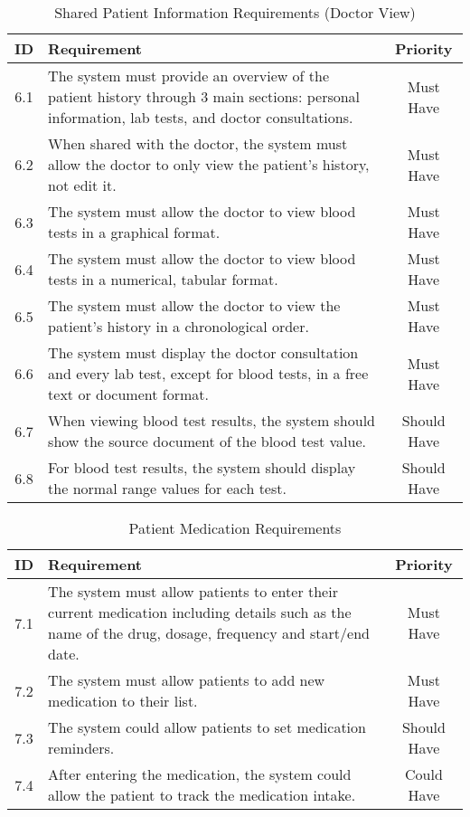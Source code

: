 \begin{table}[htbp]
    \centering
    \begin{tabular}{|c|p{10cm}|c|}
    \hline
    \textbf{ID}  & \textbf{Requirement}  & \textbf{Priority} \\ \hline
    6.1  & The system must provide an overview of the patient history through 3 main sections: personal information, lab tests, and doctor consultations. & Must Have \\ \hline
    6.2  & When shared with the doctor, the system must allow the doctor to only view the patient's history, not edit it. & Must Have \\ \hline
    6.3  & The system must allow the doctor to view blood tests in a graphical format. & Must Have \\ \hline
    6.4  & The system must allow the doctor to view blood tests in a numerical, tabular format. & Must Have \\ \hline
    6.5  & The system must allow the doctor to view the patient's history in a chronological order. & Must Have \\ \hline
    6.6  & The system must display the doctor consultation and every lab test, except for blood tests, in a free text or document format. & Must Have \\ \hline
    6.7  & When viewing blood test results, the system should show the source document of the blood test value. & Should Have \\ \hline
    6.8  & For blood test results, the system should display the normal range values for each test. & Should Have \\ \hline
    \end{tabular}
    \caption{Shared Patient Information Requirements (Doctor View)}
\end{table}

\begin{table}[htbp]
    \centering
    \begin{tabular}{|c|p{10cm}|c|}
    \hline
    \textbf{ID}  & \textbf{Requirement}  & \textbf{Priority} \\ \hline
    7.1  & The system must allow patients to enter their current medication including details such as the name of the drug, dosage, frequency and start/end date. & Must Have \\ \hline
    7.2 & The system must allow patients to add new medication to their list. & Must Have \\ \hline
    7.3  & The system could allow patients to set medication reminders. & Should Have \\ \hline
    7.4 & After entering the medication, the system could allow the patient to track the medication intake. & Could Have \\ \hline

    \end{tabular}
    \caption{Patient Medication Requirements}
\end{table}


